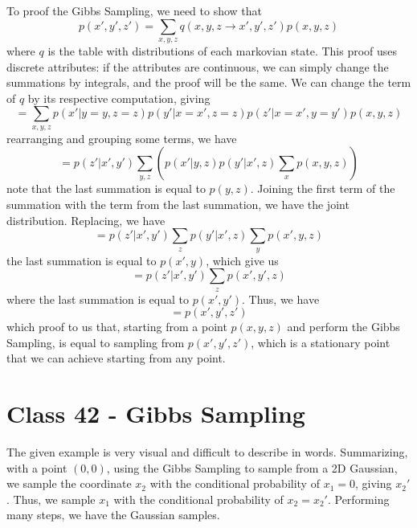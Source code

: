 \documentclass{article}
\begin{document}
To proof the Gibbs Sampling, we need to show that 
\begin{equation}
    p(x',y',z') = \sum_{x, y, z} q(x, y, z \rightarrow x', y', z')p(x, y, z)
\end{equation}
where $q$ is the table with distributions of each markovian state. This proof uses discrete attributes: if the attributes are continuous, we can simply change the summations by integrals, and the proof will be the same. We can change the term of $q$ by its respective computation, giving
\begin{equation}
    = \sum_{x, y, z} p(x'| y = y, z = z) p(y'| x = x', z = z) p(z'| x = x', y = y') p(x, y, z)
\end{equation}
rearranging and grouping some terms, we have
\begin{equation}
    = p(z'| x', y') \sum_{y, z}\left( p(x'| y, z) p(y'|x', z)\sum_x p(x, y, z) \right)
\end{equation}
note that the last summation is equal to $p(y, z)$. Joining the first term of the summation with the term from the last summation, we have the joint distribution. Replacing, we have
\begin{equation}
    = p(z'| x', y') \sum_{z} p(y'|x', z) \sum_ y p(x', y, z)
\end{equation}
the last summation is equal to $p(x', y)$, which give us
\begin{equation}
    = p(z'| x', y') \sum_{z} p(x', y', z)
\end{equation}
where the last summation is equal to $p(x', y')$. Thus, we have
\begin{equation}
    = p(x', y', z')
\end{equation}
which proof to us that, starting from a point $p(x, y, z)$ and perform the Gibbs Sampling, is equal to sampling from $p(x', y', z')$, which is a stationary point that we can achieve starting from any point.

\section{Class 42 - Gibbs Sampling}
The given example is very visual and difficult to describe in words. Summarizing, with a point $(0, 0)$, using the Gibbs Sampling to sample from a 2D Gaussian, we sample the coordinate $x_2$ with the conditional probability of $x_1 = 0$, giving $x_2'$. Thus, we sample $x_1$ with the conditional probability of $x_2 = x_2'$. Performing many steps, we have the Gaussian samples.
\end{document}
